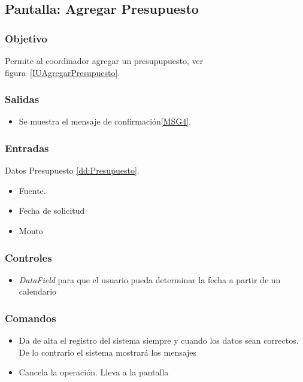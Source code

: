 \subsection{Pantalla: Agregar Presupuesto}

\subsubsection{Objetivo}
Permite al coordinador agregar un presupupuesto, ver figura~\ref{IUAgregarPresupuesto}.


\subsubsection{Salidas}
\begin{itemize}
 \item Se muestra el mensaje de confirmación\ref{MSG4}.
 \end{itemize}

\subsubsection{Entradas}
Datos Presupuesto \ref{dd:Presupuesto}.
\begin{itemize}
 \item Fuente.
 \item Fecha de solicitud
 \item Monto

\end{itemize}

\subsubsection{Controles}
\begin{itemize}
 \item \textit{DataField} para que el usuario pueda determinar la fecha a partir de un calendario
\end{itemize}

\subsubsection{Comandos}
\begin{itemize}
 \item {} Da de alta el registro del sistema siempre y cuando los datos sean correctos. De lo contrario el sistema mostrará los mensajes 
 \item {} Cancela la operación. Lleva a la pantalla 
\end{itemize}

